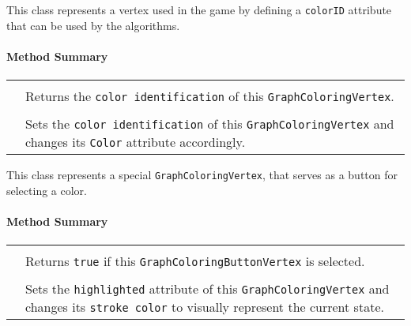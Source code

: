 This class represents a \gls{vertex} used in the \graphcoloring \gls{game} by defining a \texttt{colorID} attribute that can be used by the \graphcoloring \gls{algorithm}s. \\


\centerdash

\paragraph*{Method Summary}
\paragraph*{}
\begin{longtable}{Lp{10cm}}
	\startmethodtable
	 \\
	& Returns the \texttt{color identification} of this \texttt{GraphColoringVertex}. \\
	 \\
	& Sets the \texttt{color identification} of this \texttt{GraphColoringVertex} and changes its \texttt{Color} attribute accordingly. \\
	
	\hline
\end{longtable}

\pagebreak


This class represents a special \texttt{GraphColoringVertex}, that serves as a button for selecting a color. \\ 

\centerdash

\paragraph*{Method Summary}
\paragraph*{}
\begin{longtable}{Lp{10cm}}
	\startmethodtable
	 \\
	& Returns \texttt{true} if this \texttt{GraphColoringButtonVertex} is selected. \\
	 \\
	& Sets the \texttt{highlighted} attribute of this \texttt{GraphColoringVertex} and changes its \texttt{stroke color} to visually represent the current state. \\
	\hline
\end{longtable}

